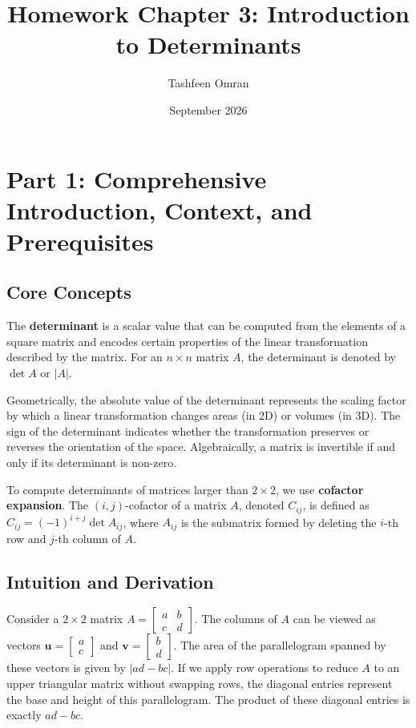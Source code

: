 \documentclass{article}
\title{Homework Chapter 3: Introduction to Determinants}
\author{Tashfeen Omran}
\date{September 2026}
\begin{document}
\maketitle
\tableofcontents
\newpage

\section{Part 1: Comprehensive Introduction, Context, and Prerequisites}

\subsection{Core Concepts}
The \textbf{determinant} is a scalar value that can be computed from the elements of a square matrix and encodes certain properties of the linear transformation described by the matrix. For an $n \times n$ matrix $A$, the determinant is denoted by $\det A$ or $|A|$. 

Geometrically, the absolute value of the determinant represents the scaling factor by which a linear transformation changes areas (in 2D) or volumes (in 3D). The sign of the determinant indicates whether the transformation preserves or reverses the orientation of the space. Algebraically, a matrix is invertible if and only if its determinant is non-zero.

To compute determinants of matrices larger than $2 \times 2$, we use \textbf{cofactor expansion}. The $(i, j)$-cofactor of a matrix $A$, denoted $C_{ij}$, is defined as $C_{ij} = (-1)^{i+j} \det A_{ij}$, where $A_{ij}$ is the submatrix formed by deleting the $i$-th row and $j$-th column of $A$.

\subsection{Intuition and Derivation}
Consider a $2 \times 2$ matrix $A = \begin{bmatrix} a & b \\ c & d \end{bmatrix}$. The columns of $A$ can be viewed as vectors $\mathbf{u} = \begin{bmatrix} a \\ c \end{bmatrix}$ and $\mathbf{v} = \begin{bmatrix} b \\ d \end{bmatrix}$. The area of the parallelogram spanned by these vectors is given by $|ad - bc|$. If we apply row operations to reduce $A$ to an upper triangular matrix without swapping rows, the diagonal entries represent the base and height of this parallelogram. The product of these diagonal entries is exactly $ad - bc$. 
\end{document}
